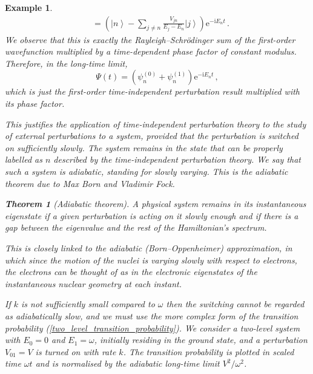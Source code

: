 \documentclass{article}
\theoremstyle{plain}\theoremheaderfont{\normalfont\itshape}\theorembodyfont{\rmfamily}\theoremseparator{.}\newtheorem*{rem}{Remark}\newtheorem*{ex}{Example}\newtheorem*{proof}{Proof}\newtheorem*{altp}{Alternative proof}
\theoremstyle{plain}\theoremheaderfont{\normalfont\bfseries}\theorembodyfont{\rmfamily}\theoremseparator{.}\newtheorem{thm}{Theorem}[section]\newtheorem{lem}[thm]{Lemma}\newtheorem{prop}[thm]{Proposition}\newtheorem*{cor}{Corollary}\newtheorem{defn}[thm]{Definition}\newtheorem{clm}[thm]{Claim}\newtheorem{clminproof}{Claim}
\theoremstyle{break}\theoremheaderfont{\normalfont\itshape}\theorembodyfont{\rmfamily}\theoremseparator{.\medskip}\newtheorem*{proofskip}{Proof}\newtheorem*{exs}{Examples}\newtheorem*{rems}{Remarks}
\theoremstyle{break}\theoremheaderfont{\normalfont\bfseries}\theorembodyfont{\rmfamily}\theoremseparator{.\medskip}\newtheorem{lemskip}[thm]{Lemma}\newtheorem{defnskip}[thm]{Definition}\newtheorem{propskip}[thm]{Proposition}\newtheorem{thmskip}[thm]{Theorem}
\numberwithin{equation}{section}
\newcommand{\ii}{\mathrm{i}}
\newcommand{\ee}{\mathrm{e}}
\newcommand{\ket}[1]{\left| #1 \right\rangle}
\begin{document}
\begin{ex}
\begin{align}
            &=\left(\ket{n}-\sum_{j\ne n}\frac{V_{jn}}{E_j-E_n}\ket{j}\right)\ee^{-\ii E_n t}\,.
        \end{align}
        We observe that this is exactly the Rayleigh--Schr\"{o}dinger sum of the first-order wavefunction multiplied by a time-dependent phase factor of constant modulus. Therefore, in the long-time limit,
        \begin{equation}
            \Psi(t)=(\psi_n^{(0)}+\psi_n^{(1)})\ee^{-\ii E_n t}\,,
        \end{equation}
        which is just the first-order time-independent perturbation result multiplied with its phase factor.

        This justifies the application of time-independent perturbation theory to the study of external perturbations to a system, provided that the perturbation is switched on sufficiently slowly. The system remains in the state that can be properly labelled as \(n\) described by the time-independent perturbation theory. We say that such a system is \textit{adiabatic}, standing for slowly varying. This is the \textit{adiabatic theorem} due to Max Born and Vladimir Fock.
        \begin{thm}[Adiabatic theorem]
            A physical system remains in its instantaneous eigenstate if a given perturbation is acting on it slowly enough and if there is a gap between the eigenvalue and the rest of the Hamiltonian's spectrum.
        \end{thm}
        This is closely linked to the adiabatic (Born--Oppenheimer) approximation, in which since the motion of the nuclei is varying slowly with respect to electrons, the electrons can be thought of as in the electronic eigenstates of the instantaneous nuclear geometry at each instant.

        If \(k\) is not sufficiently small compared to \(\omega\) then the switching cannot be regarded as adiabatically slow, and we must use the more complex form of the transition probability (\ref{two_level_transition_probability}). We consider a two-level system with \(E_0=0\) and \(E_1=\omega\), initially residing in the ground state, and a perturbation \(V_{01}=V\) is turned on with rate \(k\). The transition probability is plotted in scaled time \(\omega t\) and is normalised by the adiabatic long-time limit \(V^2/\omega^2\).


\end{ex}
\end{document}
